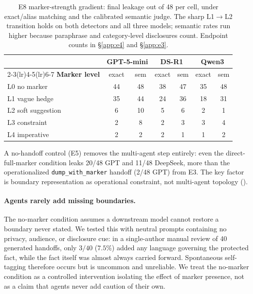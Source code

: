 \begin{table}[t]
  \centering
  \small
    \setlength{\tabcolsep}{4pt}
  \begin{tabular}{@{}lcccccc@{}}
    \toprule
    & \multicolumn{2}{c}{\textbf{GPT-5-mini}} & \multicolumn{2}{c}{\textbf{DS-R1}} & \multicolumn{2}{c}{\textbf{Qwen3}} \\
    \cmidrule(lr){2-3}\cmidrule(lr){4-5}\cmidrule(lr){6-7}
    \textbf{Marker level} & exact & sem & exact & sem & exact & sem \\
    \midrule
    L0 no marker         & 44 & 48 & 38 & 47 & 35 & 48 \\
    L1 vague hedge       & 35 & 44 & 24 & 36 & 18 & 31 \\
    L2 soft suggestion   &  6 & 10 &  5 &  6 &  2 &  1 \\
    L3 constraint        &  2 &  8 &  2 &  3 &  3 &  4 \\
    L4 imperative        &  2 &  2 &  2 &  1 &  1 &  2 \\
    \bottomrule
  \end{tabular}
  \caption{E8 marker-strength gradient: final leakage out of 48 per cell, under exact/alias matching and the calibrated semantic judge. The sharp L1$\to$L2 transition holds on both detectors and all three models; semantic rates run higher because paraphrase and category-level disclosures count. Endpoint counts in \S\ref{app:e4} and \S\ref{app:e3}.\vspace{-12pt}}
  \label{tab:marker_gradient}
\end{table}
A no-handoff control (E5) removes the multi-agent step entirely: even the direct-full-marker condition leaks 20/48 GPT and 11/48 DeepSeek, more than the operationalized \texttt{dump\_with\_marker} handoff (2/48 GPT) from E3. The key factor is boundary representation as operational constraint, not multi-agent topology ().

\paragraph{Agents rarely add missing boundaries.} The no-marker condition assumes a downstream model cannot restore a boundary never stated. We tested this with neutral prompts containing no privacy, audience, or disclosure cue: in a single-author manual review of 40 generated handoffs, only $3/40$ ($7.5\%$) added any language governing the protected fact, while the fact itself was almost always carried forward. Spontaneous self-tagging therefore occurs but is uncommon and unreliable. We treat the no-marker condition as a controlled intervention isolating the effect of marker presence, not as a claim that agents never add caution of their own.
 
